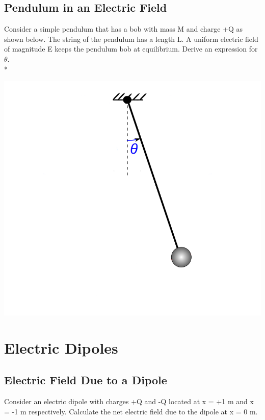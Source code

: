 \documentclass[11pt]{article}
\begin{document}
\subsection{Pendulum in an Electric Field}
Consider a simple pendulum that has a bob with mass M and charge +Q as shown below.  The string of the pendulum has a length L.  A uniform electric field of magnitude E keeps the pendulum bob at equilibrium.  Derive an expression for $\theta$.\\*

\begin{center}
\includegraphics[scale=0.25]{Images/pendulum-efield.png}
\end{center}

\pagebreak
\section{Electric Dipoles}
\vspace{10pt}

\subsection{Electric Field Due to a Dipole}
Consider an electric dipole with charges +Q and -Q located at x = +1 m and x = -1 m respectively.  Calculate the net electric field due to the dipole at x = 0 m.
\end{document}

